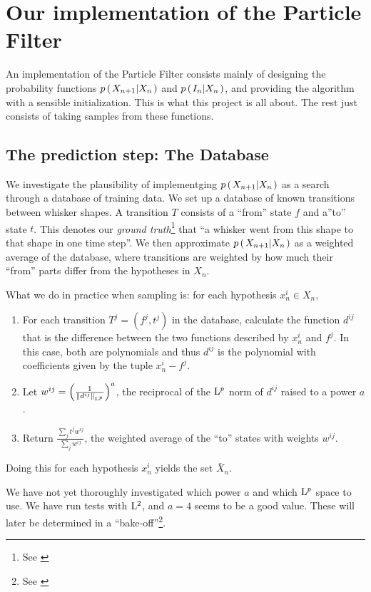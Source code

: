 \section*{Our implementation of the Particle Filter}
An implementation of the Particle Filter consists mainly of designing the probability functions $p\left(\left. X_{n+1} \middle\vert X_n \right.\right)$ and $p\left(\left. I_n \middle\vert X_n \right.\right)$, and providing the algorithm with a sensible initialization. This is what this project is all about. The rest just consists of taking samples from these functions.

\subsection*{The prediction step: The Database}

We investigate the plausibility of implementging $p\left(\left. X_{n+1} \middle\vert X_n \right.\right)$ as a search through a database of training data. We set up a database of known transitions between whisker shapes. A transition $T$ consists of a ``from'' state $f$ and a''to'' state $t$. This denotes our \emph{ground truth}\footnote{See \cite{EncyclopediaMachineLearning}} that ``a whisker went from this shape to that shape in one time step''. We then approximate $p\left(\left. X_{n+1} \middle\vert X_n \right.\right)$ as a weighted average of the database, where transitions are weighted by how much their ``from'' parts differ from the hypotheses in $X_n$.

What we do in practice when sampling is: for each hypothesis $x_n^i \in X_n$,

\begin{enumerate}
  \item For each transition $T^j = (f^j, t^j)$ in the database, calculate the function $d^{ij}$ that is the difference between the two functions described by $x_n^i$ and $f^j$. In this case, both are polynomials and thus $d^{ij}$ is the polynomial with coefficients given by the tuple $x_n^i - f^j$.
  \item Let $w^{ij} = \left(\frac{1}{\left\|d^{ij}\right\|_{\mathrm{L}^{p}}}\right)^a$, the reciprocal of the $\mathrm{L}^{p}$ norm of $d^{ij}$ raised to a power $a$.
  \item Return $\frac{\sum_j t^j w^{ij}}{\sum_jw^{ij}}$, the weighted average of the ``to'' states with weights $w^{ij}$.
\end{enumerate}

Doing this for each hypothesis $x_n^i$ yields the set $\bar{X}_n$.

We have not yet thoroughly investigated which power $a$ and which $\mathrm{L}^{p}$ space to use. We have run tests with $\mathrm{L}^{2}$, and $a=4$ seems to be a good value. These will later be determined in a ``bake-off''\footnote{See \cite{EncyclopediaMachineLearning}}.

